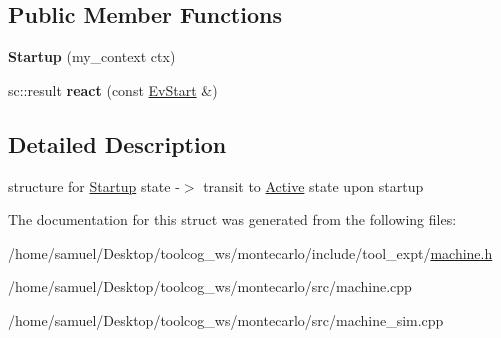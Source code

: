 \subsection*{Public Member Functions}
\begin{DoxyCompactItemize}
\item 
\mbox{\label{structStartup_a5c2eb9104acf334635199f460487d378}} 
{\bfseries Startup} (my\+\_\+context ctx)
\item 
\mbox{\label{structStartup_a5e1f550cefd2f461e8ed83a5c50591c1}} 
sc\+::result {\bfseries react} (const \hyperlink{structEvStart}{Ev\+Start} \&)
\end{DoxyCompactItemize}


\subsection{Detailed Description}
structure for \hyperlink{structStartup}{Startup} state -\/$>$ transit to \hyperlink{structActive}{Active} state upon startup 

The documentation for this struct was generated from the following files\+:\begin{DoxyCompactItemize}
\item 
/home/samuel/\+Desktop/toolcog\+\_\+ws/montecarlo/include/tool\+\_\+expt/\hyperlink{machine_8h}{machine.\+h}\item 
/home/samuel/\+Desktop/toolcog\+\_\+ws/montecarlo/src/machine.\+cpp\item 
/home/samuel/\+Desktop/toolcog\+\_\+ws/montecarlo/src/machine\+\_\+sim.\+cpp\end{DoxyCompactItemize}
